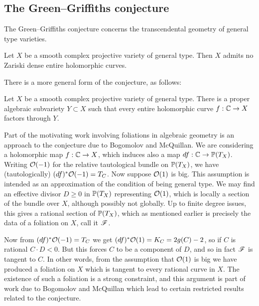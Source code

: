 

\subsection{The Green--Griffiths conjecture}\label{sec:greengriffiths}

The Green--Griffiths conjecture concerns the transcendental geometry of general
type varieties.

\begin{conjecture}
    Let $X$ be a smooth complex projective variety of general type. Then $X$
    admits no Zariski dense entire holomorphic curves.
\end{conjecture}

There is a more general form of the conjecture, as follows:

\begin{conjecture}
    Let $X$ be a smooth complex projective variety of general type. There is a
    proper algebraic subvariety $Y\subset X$ such that every entire holomorphic
    curve $f:\C\to X$ factors through $Y$.
\end{conjecture}

Part of the motivating work involving foliations in algebraic geometry is an
approach to the conjecture due to Bogomolov and McQuillan. We are considering a
holomorphic map $f:\C\to X$, which induces also a map $df:\C\to\P(T_X)$. Writing
$\O(-1)$ for the relative tautological bundle on $\P(T_X)$, we have
(tautologically) $(df)^*\O(-1)=T_C$. Now suppose $\O(1)$ is big. This assumption
is intended as an approximation of the condition of being general type. We may
find an effective divisor $D\ge0$ in $\P(T_X)$ representing $\O(1)$, which is
locally a section of the bundle over $X$, although possibly not globally. Up to
finite degree issues, this gives a rational section of $\P(T_X)$, which as
mentioned earlier is precisely the data of a foliation on $X$, call it $\scrF$.

Now from $(df)^*\O(-1)=T_C$ we get $(df)^*\O(1)=K_C=2g(C)-2$, so if $C$ is
rational $C\cdot D<0$. But this forces $C$ to be a component of $D$, and so in
fact $\scrF$ is tangent to $C$. %
In other words, from the assumption that $\O(1)$ is big we have produced a
foliation on $X$ which is tangent to every rational curve in $X$. The existence
of such a foliation is a strong constraint, and this argument is part of work
due to Bogomolov and McQuillan \cite{mcquillan_98} which lead to certain
restricted results related to the conjecture.

